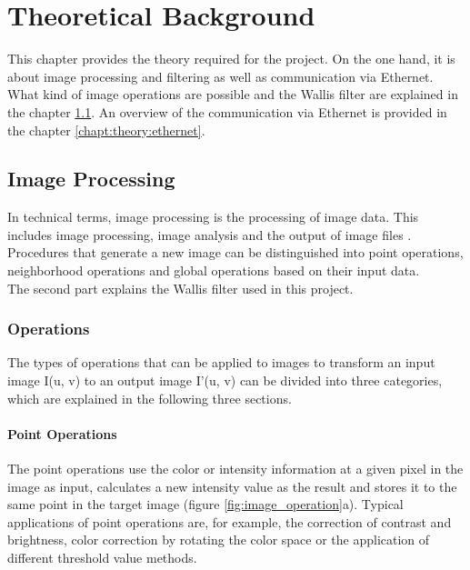 %
%
\chapter{Theoretical Background} \label{chapt:theoreticalback}
This chapter provides the theory required for the project. On the one hand, it is about image processing and filtering as well as communication via Ethernet. What kind of image operations are possible and the Wallis filter are explained in the chapter \ref{chapt:theory:imageprocessing}. An overview of the communication via Ethernet is provided in the chapter \ref{chapt:theory:ethernet}.


%
%
\section{Image Processing} \label{chapt:theory:imageprocessing}
In technical terms, image processing is the processing of image data. This includes image processing, image analysis and the output of image files \cite{image_processing}. Procedures that generate a new image can be distinguished into point operations, neighborhood operations and global operations based on their input data. \\
The second part explains the Wallis filter used in this project.

\subsection{Operations}
The types of operations that can be applied to images to transform an input image I(u, v) to an output image I'(u, v) can be divided into three categories, which are explained in the following three sections.

\subsubsection*{Point Operations}
The point operations use the color or intensity information at a given pixel in the image as input, calculates a new intensity value as the result and stores it to the same point in the target image (figure \ref{fig:image_operation}a). Typical applications of point operations are, for example, the correction of contrast and brightness, color correction by rotating the color space or the application of different threshold value methods.

